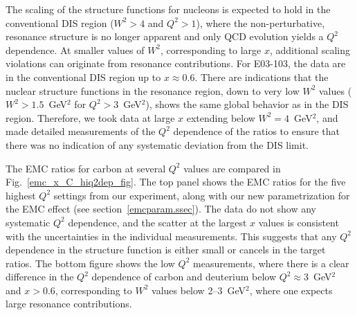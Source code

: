 The scaling of the structure functions for nucleons is expected to hold 
in the conventional DIS region ($W^2>4$ and $Q^2>1$), where the
non-perturbative, resonance structure is no longer apparent and only
QCD evolution yields a $Q^2$ dependence. At smaller values
of $W^2$, corresponding to large $x$, additional scaling violations can
originate from resonance contributions. For E03-103, the data are in the
conventional DIS region up to $x \approx 0.6$.  There are indications
\cite{Arrington:2003nt} that the nuclear structure functions in the resonance
region, down to very low $W^2$ values ($W^2 > 1.5$~GeV$^2$ for
$Q^2>3$~GeV$^2$), shows the same global behavior as in the DIS region. 
Therefore, we took data at large $x$ extending below $W^2=4$~GeV$^2$, and made
detailed measurements of the $Q^2$ dependence of the ratios to ensure that
there was no indication of any systematic deviation from the DIS limit.

The EMC ratios for carbon at several $Q^2$ values are compared in
Fig.~\ref{emc_x_C_hiq2dep_fig}.  The top panel shows the EMC ratios for the
five highest $Q^2$ settings from our experiment, along with our new
parametrization for the EMC effect (see section~\ref{emcparam.ssec}).  The
data do not show any systematic $Q^2$ dependence, and the scatter at the
largest $x$ values is consistent with the uncertainties in the individual
measurements.  This suggests that any $Q^2$ dependence in the structure
function is either small or cancels in the target ratios.  The bottom figure
shows the low $Q^2$ measurements, where there is a clear difference in the
$Q^2$ dependence of carbon and deuterium below $Q^2 \approx 3$~GeV$^2$ and
$x>0.6$, corresponding to $W^2$ values below 2--3~GeV$^2$, where one expects
large resonance contributions.


